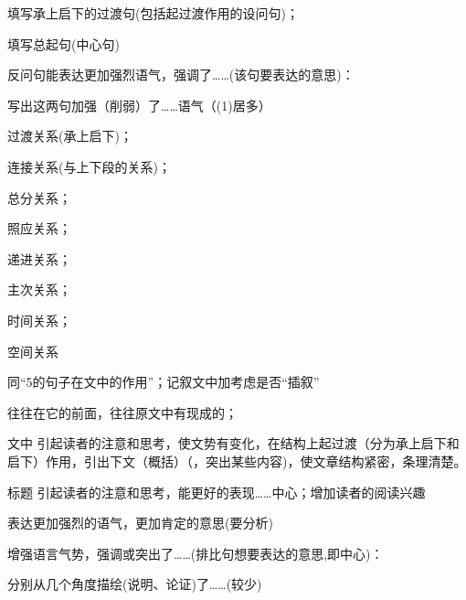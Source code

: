 \begin{asparaenum}[(1)]
\item 填写承上启下的过渡句(包括起过渡作用的设问句)；
 \item 填写总起句(中心句)
\end{asparaenum}

\begin{asparaenum}[(1)]
\item 反问句能表达更加强烈语气，强调了\ldots{}\ldots{}(该句要表达的意思)：
\item 写出这两句加强（削弱）了\ldots{}\ldots{}语气（(1)居多）
\end{asparaenum}

\begin{asparaenum}[(1)]
\item 过渡关系(承上启下)；
\item 连接关系(与上下段的关系)；
\item 总分关系；
\item 照应关系；
\item 递进关系；
\item 主次关系；
\item 时间关系；
\item 空间关系
\end{asparaenum}

同``5的句子在文中的作用''；记叙文中加考虑是否``插叙''

往往在它的前面，往往原文中有现成的；

\begin{compactdesc}
\item[文中]引起读者的注意和思考，使文势有变化，在结构上起过渡（分为承上启下和启下）作用，引出下文（概括）（，突出某些内容)，使文章结构紧密，条理清楚。
\item[标题]引起读者的注意和思考，能更好的表现\ldots{}\ldots{}中心；增加读者的阅读兴趣
\end{compactdesc}

表达更加强烈的语气，更加肯定的意思(要分析)\\

\begin{asparaenum}[(1)]
\item 增强语言气势，强调或突出了\ldots{}\ldots{}(排比句想要表达的意思,即中心)：
\item 分别从几个角度描绘(说明、论证)了\ldots{}\ldots{}(较少)
\end{asparaenum}

